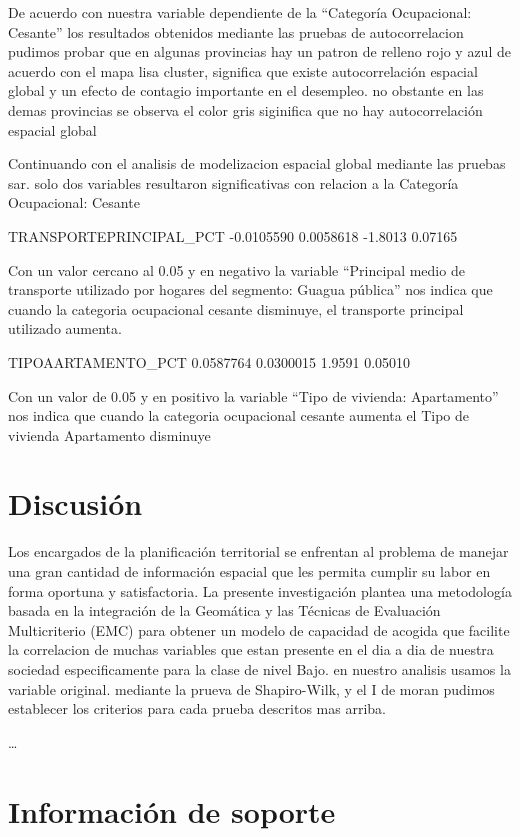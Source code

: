\documentclass[11pt,]{article}
\begin{document}
De acuerdo con nuestra variable dependiente de la ``Categoría
Ocupacional: Cesante'' los resultados obtenidos mediante las pruebas de
autocorrelacion pudimos probar que en algunas provincias hay un patron
de relleno rojo y azul de acuerdo con el mapa lisa cluster, significa
que existe autocorrelación espacial global y un efecto de contagio
importante en el desempleo. no obstante en las demas provincias se
observa el color gris siginifica que no hay autocorrelación espacial
global

Continuando con el analisis de modelizacion espacial global mediante las
pruebas sar. solo dos variables resultaron significativas con relacion a
la Categoría Ocupacional: Cesante

TRANSPORTEPRINCIPAL\_PCT -0.0105590 0.0058618 -1.8013 0.07165

Con un valor cercano al 0.05 y en negativo la variable ``Principal medio
de transporte utilizado por hogares del segmento: Guagua pública'' nos
indica que cuando la categoria ocupacional cesante disminuye, el
transporte principal utilizado aumenta.

TIPOAARTAMENTO\_PCT 0.0587764 0.0300015 1.9591 0.05010

Con un valor de 0.05 y en positivo la variable ``Tipo de vivienda:
Apartamento'' nos indica que cuando la categoria ocupacional cesante
aumenta el Tipo de vivienda Apartamento disminuye

\section{Discusión}\label{discusiuxf3n}

Los encargados de la planificación territorial se enfrentan al problema
de manejar una gran cantidad de información espacial que les permita
cumplir su labor en forma oportuna y satisfactoria. La presente
investigación plantea una metodología basada en la integración de la
Geomática y las Técnicas de Evaluación Multicriterio (EMC) para obtener
un modelo de capacidad de acogida que facilite la correlacion de muchas
variables que estan presente en el dia a dia de nuestra sociedad
especificamente para la clase de nivel Bajo. en nuestro analisis usamos
la variable original. mediante la prueva de Shapiro-Wilk, y el I de
moran pudimos establecer los criterios para cada prueba descritos mas
arriba.

\ldots

\section{Información de soporte}\label{informaciuxf3n-de-soporte-2}
\end{document}
